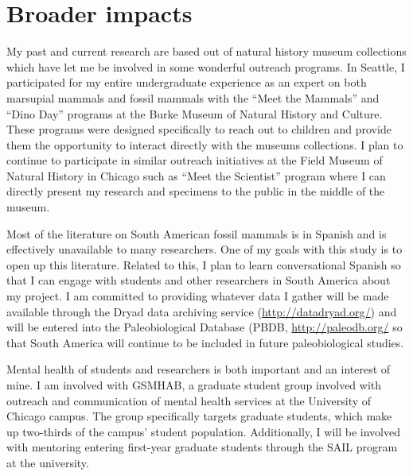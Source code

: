 \documentclass[11pt,letterpaper]{article}
\begin{document}
\section{Broader impacts}

My past and current research are based out of natural history museum collections which have let me be involved in some wonderful outreach programs. In Seattle, I participated for my entire undergraduate experience as an expert on both marsupial mammals and fossil mammals with the ``Meet the Mammals'' and ``Dino Day'' programs at the Burke Museum of Natural History and Culture. These programs were designed specifically to reach out to children and provide them the opportunity to interact directly with the museums collections. I plan to continue to participate in similar outreach initiatives at the Field Museum of Natural History in Chicago such as ``Meet the Scientist'' program where I can directly present my research and specimens to the public in the middle of the museum.

Most of the literature on South American fossil mammals is in Spanish and is effectively unavailable to many researchers. One of my goals with this study is to open up this literature. Related to this, I plan to learn conversational Spanish so that I can engage with students and other researchers in South America about my project. I am committed to providing whatever data I gather will be made available through the Dryad data archiving service (\url{http://datadryad.org/}) and will be entered into the Paleobiological Database (PBDB, \url{http://paleodb.org/} so that South America will continue to be included in future paleobiological studies. 

Mental health of students and researchers is both important and an interest of mine. I am involved with GSMHAB, a graduate student group involved with outreach and communication of mental health services at the University of Chicago campus. The group specifically targets graduate students, which make up two-thirds of the campus' student population. Additionally, I will be involved with mentoring entering first-year graduate students through the SAIL program at the university.




\end{document}
